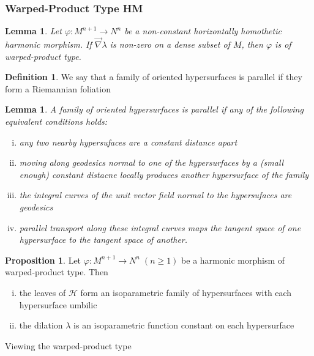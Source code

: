 \documentclass[12pt]{article}
\newtheorem{lemma}[theorem]{Lemma}
\theoremstyle{definition}
\newtheorem{definition}{Definition}[section]
\newtheorem{proposition}{Proposition}[subsection]
\numberwithin{equation}{subsection}
\begin{document}
\subsubsection{Warped-Product Type HM}

\begin{lemma}
Let $\varphi:M^{n+1} \rightarrow N^n$ be a non-constant horizontally homothetic harmonic morphism. If $\vec{\nabla} \lambda$ is non-zero on a dense subset of $M$, then $\varphi$ is of warped-product type.
\end{lemma}

\begin{definition}
We say that a family of oriented hypersurfaces is parallel if they form a Riemannian foliation
\end{definition}

\begin{lemma}
A family of oriented hypersurfaces is parallel if any of the following equivalent conditions holds:
\begin{enumerate}[(i)]
    \item any two nearby hypersufaces are a constant distance apart
    \item moving along geodesics normal to one of the hypersurfaces by a (small enough) constant distacne locally produces another hypersurface of the family
    \item the integral curves of the unit vector field normal to the hypersufaces are geodesics
    \item parallel transport along these integral curves maps the tangent space of one hypersurface to the tangent space of another.
\end{enumerate}
\end{lemma}

\begin{proposition}
Let $\varphi: M^{n+1} \rightarrow N^n \; (n \geq 1)$ be a harmonic morphism of warped-product type. Then
\begin{enumerate}[(i)]
    \item the leaves of $\mathcal{H}$ form an isoparametric family of hypersurfaces with each hypersurface umbilic
    \item the dilation $\lambda$ is an isoparametric function constant on each hypersurface
\end{enumerate}
\end{proposition}

Viewing the warped-product type \\
\end{document}

